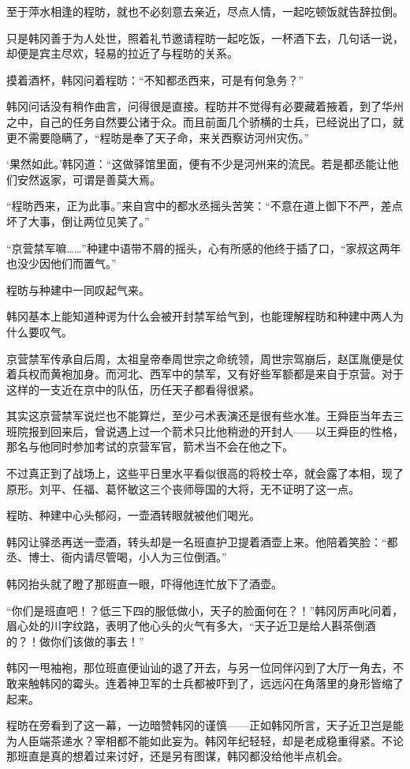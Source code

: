 至于萍水相逢的程昉，就也不必刻意去亲近，尽点人情，一起吃顿饭就告辞拉倒。

只是韩冈善于为人处世，照着礼节邀请程昉一起吃饭，一杯酒下去，几句话一说，却便是宾主尽欢，轻易的拉近了与程昉的关系。

摸着酒杯，韩冈问着程昉：“不知都丞西来，可是有何急务？”

韩冈问话没有稍作曲言，问得很是直接。程昉并不觉得有必要藏着掖着，到了华州之中，自己的任务自然要公诸于众。而且前面几个骄横的士兵，已经说出了口，就更不需要隐瞒了，“程昉是奉了天子命，来关西察访河州灾伤。”

‘果然如此。’韩冈道：“这做驿馆里面，便有不少是河州来的流民。若是都丞能让他们安然返家，可谓是善莫大焉。

“程昉西来，正为此事。”来自宫中的都水丞摇头苦笑：“不意在道上御下不严，差点坏了大事，倒让两位见笑了。”

“京营禁军嘛……”种建中语带不屑的摇头，心有所感的他终于插了口，“家叔这两年也没少因他们而置气。”

程昉与种建中一同叹起气来。

韩冈基本上能知道种谔为什么会被开封禁军给气到，也能理解程昉和种建中两人为什么要叹气。

京营禁军传承自后周，太祖皇帝奉周世宗之命统领，周世宗驾崩后，赵匡胤便是仗着兵权而黄袍加身。而河北、西军中的禁军，又有好些军额都是来自于京营。对于这样的一支近在京中的队伍，历任天子都看得很紧。

其实这京营禁军说烂也不能算烂，至少弓术表演还是很有些水准。王舜臣当年去三班院报到回来后，曾说遇上过一个箭术只比他稍逊的开封人——以王舜臣的性格，那名与他同时参加考试的京营军官，箭术当不会在他之下。

不过真正到了战场上，这些平日里水平看似很高的将校士卒，就会露了本相，现了原形。刘平、任福、葛怀敏这三个丧师辱国的大将，无不证明了这一点。

程昉、种建中心头郁闷，一壶酒转眼就被他们喝光。

韩冈让驿丞再送一壶酒，转头却是一名班直护卫提着酒壶上来。他陪着笑脸：“都丞、博士、衙内请尽管喝，小人为三位倒酒。”

韩冈抬头就了瞪了那班直一眼，吓得他连忙放下了酒壶。

“你们是班直吧！？低三下四的服低做小，天子的脸面何在？！”韩冈厉声叱问着，眉心处的川字纹路，表明了他心头的火气有多大，“天子近卫是给人斟茶倒酒的？！做你们该做的事去！”

韩冈一甩袖袍，那位班直便讪讪的退了开去，与另一位同伴闪到了大厅一角去，不敢来触韩冈的霉头。连着神卫军的士兵都被吓到了，远远闪在角落里的身形皆缩了起来。

程昉在旁看到了这一幕，一边暗赞韩冈的谨慎——正如韩冈所言，天子近卫岂是能为人臣端茶递水？宰相都不能如此妄为。韩冈年纪轻轻，却是老成稳重得紧。不论那班直是真的想着过来讨好，还是另有图谋，韩冈都没给他半点机会。

